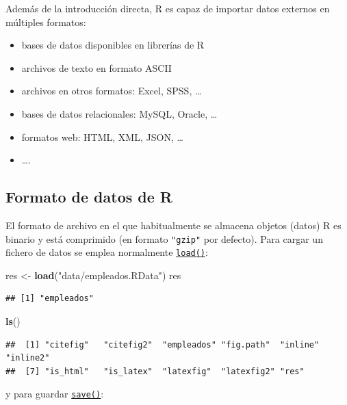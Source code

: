 \documentclass[
]{book}
\newenvironment{Shaded}{\begin{snugshade}}{\end{snugshade}}
\newcommand{\FunctionTok}[1]{\textcolor[rgb]{0.13,0.29,0.53}{\textbf{#1}}}
\newcommand{\NormalTok}[1]{#1}
\newcommand{\OtherTok}[1]{\textcolor[rgb]{0.56,0.35,0.01}{#1}}
\newcommand{\StringTok}[1]{\textcolor[rgb]{0.31,0.60,0.02}{#1}}
\begin{document}
Además de la introducción directa, R es capaz de
importar datos externos en múltiples formatos:

\begin{itemize}
\item
  bases de datos disponibles en librerías de R
\item
  archivos de texto en formato ASCII
\item
  archivos en otros formatos: Excel, SPSS, \ldots{}
\item
  bases de datos relacionales: MySQL, Oracle, \ldots{}
\item
  formatos web: HTML, XML, JSON, \ldots{}
\item
  \ldots.
\end{itemize}

\subsection{Formato de datos de R}\label{formato-de-datos-de-r}

El formato de archivo en el que habitualmente se almacena objetos (datos)
R es binario y está comprimido (en formato \texttt{"gzip"} por defecto).
Para cargar un fichero de datos se emplea normalmente \href{https://www.rdocumentation.org/packages/base/versions/3.6.1/topics/load}{\texttt{load()}}:

\begin{Shaded}
\begin{Highlighting}[]
\NormalTok{res }\OtherTok{\textless{}{-}} \FunctionTok{load}\NormalTok{(}\StringTok{"data/empleados.RData"}\NormalTok{)}
\NormalTok{res}
\end{Highlighting}
\end{Shaded}

\begin{verbatim}
## [1] "empleados"
\end{verbatim}

\begin{Shaded}
\begin{Highlighting}[]
\FunctionTok{ls}\NormalTok{()}
\end{Highlighting}
\end{Shaded}

\begin{verbatim}
##  [1] "citefig"   "citefig2"  "empleados" "fig.path"  "inline"    "inline2"  
##  [7] "is_html"   "is_latex"  "latexfig"  "latexfig2" "res"
\end{verbatim}

y para guardar \href{https://www.rdocumentation.org/packages/base/versions/3.6.1/topics/save}{\texttt{save()}}:
\end{document}
